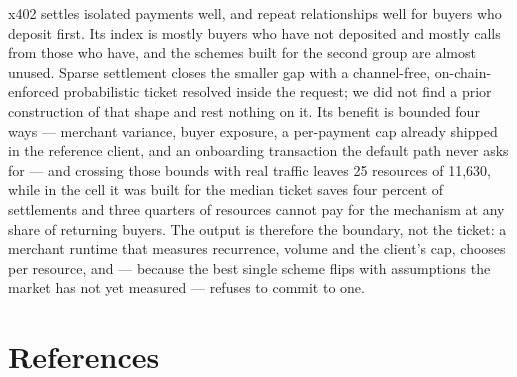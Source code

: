 \documentclass[11pt,a4paper]{article}
\begin{document}
x402 settles isolated payments well, and repeat relationships well for buyers who deposit first. Its index is
mostly buyers who have not deposited and mostly calls from those who have, and the schemes built for the second
group are almost unused. Sparse settlement closes the smaller gap with a channel-free, on-chain-enforced
probabilistic ticket resolved inside the request; we did not find a prior construction of that shape and rest
nothing on it. Its benefit is bounded four ways --- merchant variance, buyer exposure, a per-payment cap already
shipped in the reference client, and an onboarding transaction the default path never asks for --- and crossing
those bounds with real traffic leaves 25 resources of 11,630, while in the cell it was built for the median
ticket saves four percent of settlements and three quarters of resources cannot pay for the mechanism at any
share of returning buyers. The output is therefore the boundary, not the ticket: a merchant runtime that measures
recurrence, volume and the client's cap, chooses per resource, and --- because the best single scheme flips with
assumptions the market has not yet measured --- refuses to commit to one.

\section*{References}
\raggedright
\end{document}
